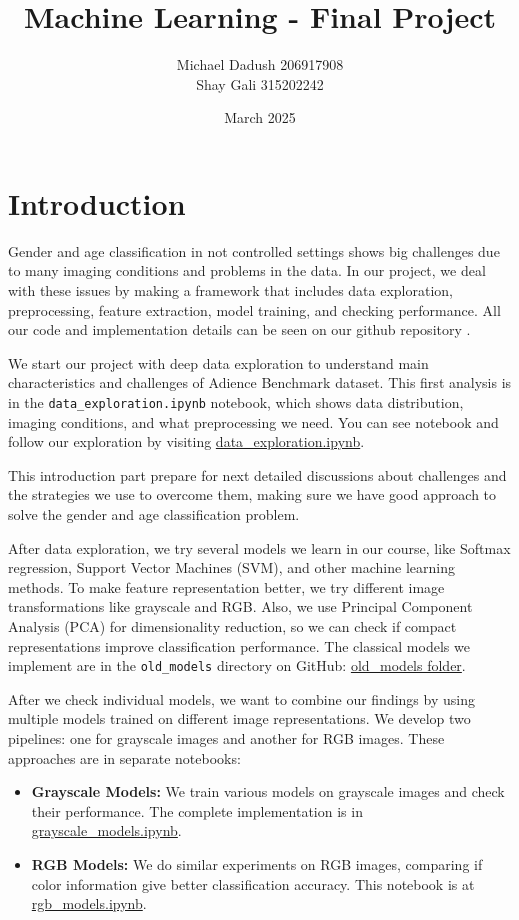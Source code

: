 \documentclass{article}
\title{Machine Learning - Final Project }
\author{Michael Dadush 206917908 \\ Shay Gali 315202242}
\date{March 2025}
\begin{document}
\maketitle


\section{Introduction}

Gender and age classification in not controlled settings shows big challenges due to many imaging conditions and problems in the data. In our project, we deal with these issues by making a framework that includes data exploration, preprocessing, feature extraction, model training, and checking performance. All our code and implementation details can be seen on our github repository \cite{github_repo}.

We start our project with deep data exploration to understand main characteristics and challenges of Adience Benchmark dataset. This first analysis is in the \texttt{data\_exploration.ipynb} notebook, which shows data distribution, imaging conditions, and what preprocessing we need. You can see notebook and follow our exploration by visiting \href{https://github.com/ShayGali/VisAge/blob/main/data_exploration.ipynb}{data\_exploration.ipynb}.

This introduction part prepare for next detailed discussions about challenges and the strategies we use to overcome them, making sure we have good approach to solve the gender and age classification problem.

After data exploration, we try several models we learn in our course, like Softmax regression, Support Vector Machines (SVM), and other machine learning methods. To make feature representation better, we try different image transformations like grayscale and RGB. Also, we use Principal Component Analysis (PCA) for dimensionality reduction, so we can check if compact representations improve classification performance. The classical models we implement are in the \texttt{old\_models} directory on GitHub: \href{https://github.com/ShayGali/VisAge/tree/main/old_models}{old\_models folder}.

After we check individual models, we want to combine our findings by using multiple models trained on different image representations. We develop two pipelines: one for grayscale images and another for RGB images. These approaches are in separate notebooks:
\begin{itemize}
    \item \textbf{Grayscale Models:} We train various models on grayscale images and check their performance. The complete implementation is in \href{https://github.com/ShayGali/VisAge/blob/main/grayscale_models.ipynb}{grayscale\_models.ipynb}.
    \item \textbf{RGB Models:} We do similar experiments on RGB images, comparing if color information give better classification accuracy. This notebook is at \href{https://github.com/ShayGali/VisAge/blob/main/rgb_models.ipynb}{rgb\_models.ipynb}.
\end{itemize}
\end{document}
